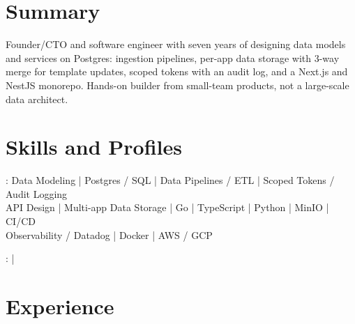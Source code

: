 \documentclass[print]{jack-resume}
\begin{document}
\pagecolor{darkmodeBackground}


\begin{minipage}[t][1cm][t]{.03\textwidth}
    \hfill
\end{minipage}

\section{Summary}
Founder/CTO and software engineer with seven years of designing data models and services on Postgres: ingestion pipelines, per-app data storage with 3-way merge for template updates, scoped tokens with an audit log, and a Next.js and NestJS monorepo. Hands-on builder from small-team products, not a large-scale data architect.
\sectionsep

\section{Skills and Profiles}
:
Data Modeling \hfill | \hfill
Postgres / SQL \hfill | \hfill
Data Pipelines / ETL \hfill | \hfill
Scoped Tokens / Audit Logging \\
\hspace{1.0cm} API Design \hfill | \hfill
Multi-app Data Storage \hfill | \hfill
Go \hfill | \hfill
TypeScript \hfill | \hfill
Python \hfill | \hfill
MinIO \hfill | \hfill
CI/CD \\
\hspace{1.0cm} Observability / Datadog \hfill | \hfill
Docker \hfill | \hfill
AWS / GCP \\

\raggedright{
    :
      \href{https://www.linkedin.com/in/jack-sturtevant/}{ \ExternalLink} |
     \href{https://github.com/jacksturt}{ \ExternalLink}}

\section{Experience}
\end{document}
